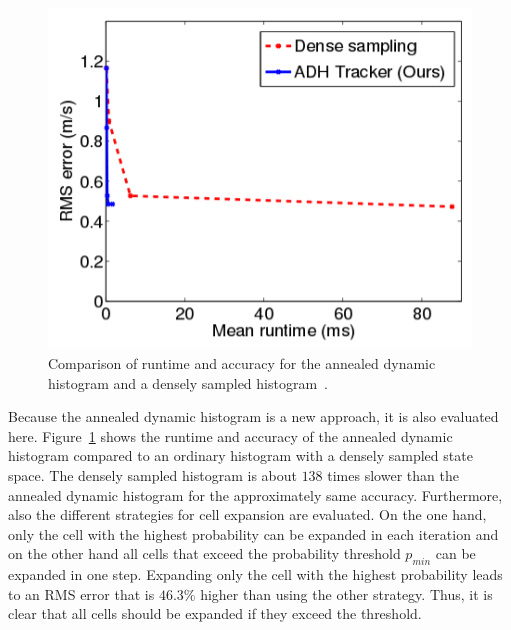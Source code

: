 \documentclass[twoside,a4paper,article]{combine}
\begin{document}
\begin{figure}
  \center
  \includegraphics[width=.5\linewidth]{adh-dense-time}
  \caption{Comparison of runtime and accuracy for the annealed dynamic
    histogram and a densely sampled histogram~\cite{paper}.}
  \label{fig:adh-vs-dense}
\end{figure}

Because the annealed dynamic histogram is a new approach, it is
also evaluated here. Figure~\ref{fig:adh-vs-dense} shows the runtime
and accuracy of the annealed dynamic histogram compared to an ordinary
histogram with a densely sampled state space. The densely sampled
histogram is about $138$ times slower than the annealed dynamic
histogram for the approximately same accuracy. Furthermore, also the
different strategies for cell expansion are evaluated. On the one
hand, only the cell with the highest probability can be expanded in
each iteration and on the other hand all cells that exceed the
probability threshold $p_{min}$ can be expanded in one step. Expanding
only the cell with the highest probability leads to an RMS error that
is $46.3\%$ higher than using the other strategy. Thus, it is clear that
all cells should be expanded if they exceed the threshold.

\end{document}
